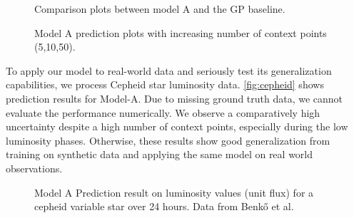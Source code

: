 \begin{figure}
	\centering
	\resizebox{0.5\textwidth}{!}{
		
	}
	\caption{Comparison plots between model A and the GP baseline.}
	\label{fig:gp_comp}
\end{figure}

\begin{figure*}
	\centering
	\resizebox{0.9\textwidth}{!}{
		
		
		
	}
	\caption{Model A prediction plots with increasing number of context points (5,10,50).}
	\label{fig:result_plot}
\end{figure*}

To apply our model to real-world data and seriously test its generalization capabilities, we process Cepheid star luminosity data. \autoref{fig:cepheid} shows prediction results for Model-A. Due to missing ground truth data, we cannot evaluate the performance numerically. We observe a comparatively high uncertainty despite a high number of context points, especially during the low luminosity phases. Otherwise, these results show good generalization from training on synthetic data and applying the same model on real world observations.

\begin{figure}
	\centering
	\resizebox{0.4\textwidth}{!}{
		
	}
	\caption{Model A Prediction result on luminosity values (unit flux) for a cepheid variable star over 24 hours. Data from Benkő et al. \cite{Benk__2014}}
	\label{fig:cepheid}
\end{figure}